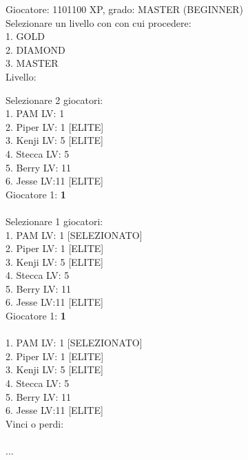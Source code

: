 \documentclass{article}
\begin{document}
\begin{tcolorbox}[
    title=Esempio 1.1
]
Giocatore: 1101100 XP, grado: MASTER (BEGINNER) \\
Selezionare un livello con con cui procedere: \\
1. GOLD \\
2. DIAMOND \\
3. MASTER \\
Livello: 
\end{tcolorbox}

\vspace{0.3cm}

\begin{tcolorbox}[
    title=Esempio 2
]
Selezionare 2 giocatori:\\
1. PAM LV: 1\\
2. Piper LV: 1 [ELITE]\\
3. Kenji LV: 5 [ELITE]\\
4. Stecca LV: 5\\
5. Berry LV: 11\\
6. Jesse LV:11 [ELITE]\\
Giocatore 1: \textbf{1}\\
\\
Selezionare 1 giocatori:\\
1. PAM LV: 1 [SELEZIONATO]\\
2. Piper LV: 1 [ELITE]\\
3. Kenji LV: 5 [ELITE]\\
4. Stecca LV: 5\\
5. Berry LV: 11\\
6. Jesse LV:11 [ELITE]\\
Giocatore 1: \textbf{1}\\
\\
1. PAM LV: 1 [SELEZIONATO]\\
2. Piper LV: 1 [ELITE]\\
3. Kenji LV: 5 [ELITE]\\
4. Stecca LV: 5\\
5. Berry LV: 11\\
6. Jesse LV:11 [ELITE]\\
Vinci o perdi:\\
\\
...
\end{tcolorbox}

\vspace{0.3 cm}
\end{document}
